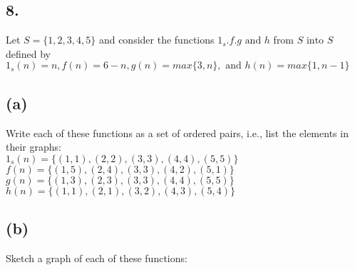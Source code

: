 \documentclass[11pt]{article}
\begin{document}
\subsection*{8.}
\begin{center}
Let $S = \{1,2,3,4,5\}$ and consider the functions $1_{s}. f. g \text{ and } h$ from $S \text{ into } S$\\
defined by $1_{s}(n) =n,f(n) = 6 -n, g(n) = max\{3,n\}, \text{ and } h(n) = max\{1, n-1\}$
\end{center}

\subsection*{(a)}
\begin{center}
Write each of these functions as a set of ordered pairs, i.e., list the elements in their graphs:\\
\hfill \break
$1_{s}(n) = \{(1,1), (2,2), (3,3), (4,4), (5,5)\}$\\
$f(n) = \{(1,5), (2,4), (3,3), (4,2), (5,1)\}$\\
$g(n) = \{(1,3), (2,3), (3,3), (4,4), (5,5)\}$\\
$h(n) = \{(1,1), (2,1), (3,2), (4,3), (5,4)\}$\\
\end{center}

\subsection*{(b)}
\begin{center}
Sketch a graph of each of these functions:\\
\hfill \break
{}
%
%
%
\end{center}
%
%
\hfill \break
\hfill \break
\end{document}
